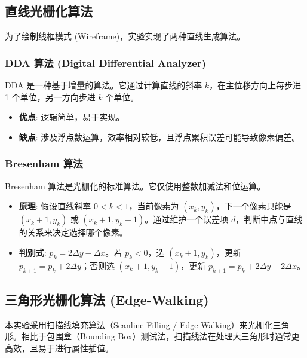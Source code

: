\documentclass[a4paper]{article}
\begin{document}
\subsection{直线光栅化算法}
为了绘制线框模式 (Wireframe)，实验实现了两种直线生成算法。

\subsubsection{DDA 算法 (Digital Differential Analyzer)}
DDA 是一种基于增量的算法。它通过计算直线的斜率 $k$，在主位移方向上每步进 1 个单位，另一方向步进 $k$ 个单位。
\begin{itemize}
    \item \textbf{优点}: 逻辑简单，易于实现。
    \item \textbf{缺点}: 涉及浮点数运算，效率相对较低，且浮点累积误差可能导致像素偏差。
\end{itemize}

\subsubsection{Bresenham 算法}
Bresenham 算法是光栅化的标准算法。它仅使用整数加减法和位运算。
\begin{itemize}
    \item \textbf{原理}: 假设直线斜率 $0 < k < 1$，当前像素为 $(x_k, y_k)$，下一个像素只能是 $(x_k+1, y_k)$ 或 $(x_k+1, y_k+1)$。通过维护一个误差项 $d$，判断中点与直线的关系来决定选择哪个像素。
    \item \textbf{判别式}: $p_k = 2\Delta y - \Delta x$。若 $p_k < 0$，选 $(x_k+1, y_k)$，更新 $p_{k+1} = p_k + 2\Delta y$；否则选 $(x_k+1, y_k+1)$，更新 $p_{k+1} = p_k + 2\Delta y - 2\Delta x$。
\end{itemize}

\subsection{三角形光栅化算法 (Edge-Walking)}
本实验采用扫描线填充算法（Scanline Filling / Edge-Walking）来光栅化三角形。相比于包围盒（Bounding Box）测试法，扫描线法在处理大三角形时通常更高效，且易于进行属性插值。
\end{document}
